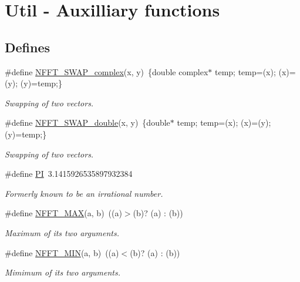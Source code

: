 \hypertarget{group__nfftutil}{
\section{Util - Auxilliary functions}
\label{group__nfftutil}
}
\subsection*{Defines}
\begin{CompactItemize}
\item 
\hypertarget{group__nfftutil_ga55}{
\#define \hyperlink{group__nfftutil_ga55}{NFFT\_\-SWAP\_\-complex}(x, y)~\{double complex$\ast$ temp; temp=(x); (x)=(y); (y)=temp;\}}
\label{group__nfftutil_ga55}

\begin{CompactList}\small\item\em Swapping of two vectors. \item\end{CompactList}\item 
\hypertarget{group__nfftutil_ga56}{
\#define \hyperlink{group__nfftutil_ga56}{NFFT\_\-SWAP\_\-double}(x, y)~\{double$\ast$ temp; temp=(x); (x)=(y); (y)=temp;\}}
\label{group__nfftutil_ga56}

\begin{CompactList}\small\item\em Swapping of two vectors. \item\end{CompactList}\item 
\hypertarget{group__nfftutil_ga57}{
\#define \hyperlink{group__nfftutil_ga57}{PI}~3.1415926535897932384}
\label{group__nfftutil_ga57}

\begin{CompactList}\small\item\em Formerly known to be an irrational number. \item\end{CompactList}\item 
\hypertarget{group__nfftutil_ga58}{
\#define \hyperlink{group__nfftutil_ga58}{NFFT\_\-MAX}(a, b)~((a)$>$(b)? (a) : (b))}
\label{group__nfftutil_ga58}

\begin{CompactList}\small\item\em Maximum of its two arguments. \item\end{CompactList}\item 
\hypertarget{group__nfftutil_ga59}{
\#define \hyperlink{group__nfftutil_ga59}{NFFT\_\-MIN}(a, b)~((a)$<$(b)? (a) : (b))}
\label{group__nfftutil_ga59}

\begin{CompactList}\small\item\em Mimimum of its two arguments. \item\end{CompactList}\end{CompactItemize}
